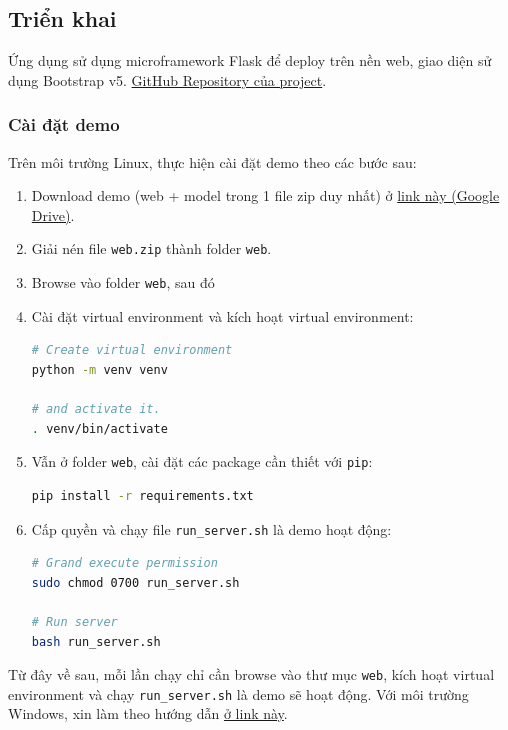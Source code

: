 \documentclass[12pt]{article}
\begin{document}
\subsection{Triển khai}
Ứng dụng sử dụng microframework Flask để deploy trên nền web, giao diện sử dụng Bootstrap v5. \href{https://github.com/trhgquan/fakenews-detection}{GitHub Repository của project}.

\subsubsection{Cài đặt demo}
Trên môi trường Linux, thực hiện cài đặt demo theo các bước sau:
\begin{enumerate}
\item Download demo (web + model trong 1 file zip duy nhất) ở \href{https://drive.google.com/file/d/1-7jwQowqCDU2bm2mvWxMoZPpKBew35E-/view?usp=sharing}{link này (Google Drive)}.
\item Giải nén file \texttt{web.zip} thành folder \texttt{web}.
\item Browse vào folder \texttt{web}, sau đó 
\item Cài đặt virtual environment và kích hoạt virtual environment:
\begin{lstlisting}[language=bash]
# Create virtual environment
python -m venv venv

# and activate it.
. venv/bin/activate
\end{lstlisting}

\item Vẫn ở folder \texttt{web}, cài đặt các package cần thiết với \texttt{pip}:
\begin{lstlisting}[language=bash]
pip install -r requirements.txt
\end{lstlisting}

\item Cấp quyền và chạy file \texttt{run\_server.sh} là demo hoạt động:
\begin{lstlisting}[language=bash]
# Grand execute permission
sudo chmod 0700 run_server.sh

# Run server
bash run_server.sh
\end{lstlisting}
\end{enumerate}

Từ đây về sau, mỗi lần chạy chỉ cần browse vào thư mục \texttt{web}, kích hoạt virtual environment và chạy \texttt{run\_server.sh} là demo sẽ hoạt động. Với môi trường Windows, xin làm theo hướng dẫn \href{https://github.com/trhgquan/fakenews-detection#windows}{ở link này}.
\end{document}

